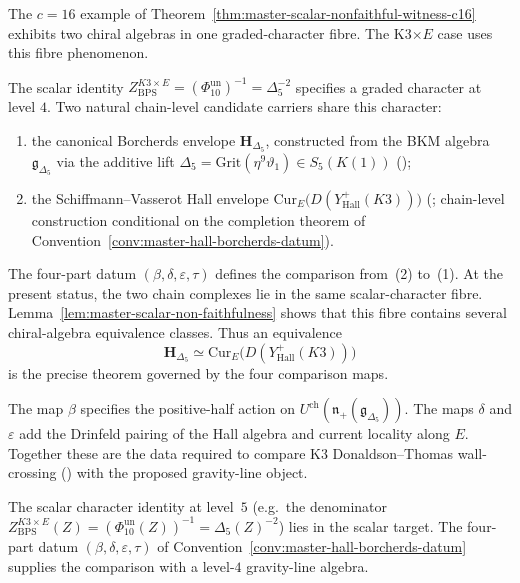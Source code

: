 \begin{remark}
\label{rem:master-witness-K3E-ramification}
The $c=16$ example of
Theorem~\ref{thm:master-scalar-nonfaithful-witness-c16} exhibits two
chiral algebras in one graded-character fibre.  The K3$\times E$ case
uses this fibre phenomenon.

The scalar identity $Z_{\mathrm{BPS}}^{K3 \times E} =
(\Phi_{10}^{\mathrm{un}})^{-1} = \Delta_5^{-2}$ specifies a graded
character at level $4$. Two natural chain-level candidate carriers
share this character:
\begin{enumerate}[label=\textup{(\arabic*)}]
\item the canonical Borcherds envelope
$\mathbf H_{\Delta_5}$, constructed from the BKM algebra
$\mathfrak g_{\Delta_5}$ via the additive lift $\Delta_5
= \mathrm{Grit}(\eta^9 \vartheta_1) \in S_5(K(1))$
\textup{(}\cite[Thm.~6.1]{Gritsenko1999}\textup{);}
\item the Schiffmann--Vasserot Hall envelope
$\mathrm{Cur}_E\bigl(D(Y^+_{\mathrm{Hall}}(K3))\bigr)$
\textup{(}\cite{SMMV23}; chain-level construction conditional on the
completion theorem of
Convention~\ref{conv:master-hall-borcherds-datum}\textup{).}
\end{enumerate}
The four-part datum $(\beta,\delta,\varepsilon,\tau)$ defines the
comparison from~\textup{(2)} to~\textup{(1)}.  At the present status,
the two chain complexes lie in the same scalar-character fibre.
Lemma~\ref{lem:master-scalar-non-faithfulness} shows that this fibre
contains several chiral-algebra equivalence classes.  Thus an
equivalence
\[
 \mathbf H_{\Delta_5}\simeq
 \mathrm{Cur}_E\bigl(D(Y^+_{\mathrm{Hall}}(K3))\bigr)
\]
is the precise theorem governed by the four comparison maps.

The map $\beta$ specifies the positive-half action on
$U^{\mathrm{ch}}(\mathfrak n_+(\mathfrak g_{\Delta_5}))$.  The maps
$\delta$ and $\varepsilon$ add the Drinfeld pairing of the Hall
algebra and current locality along $E$.  Together these are the data
required to compare K3 Donaldson--Thomas wall-crossing
\textup{(}\cite{KontsevichSoibelman}\textup{)} with the proposed
gravity-line object.
\end{remark}

\begin{remark}
\label{rem:master-scalar-shadow-promotion}
The scalar character identity at level~$5$
\textup{(}e.g.\ the denominator
$Z_{\mathrm{BPS}}^{K3\times E}(Z)
 = (\Phi_{10}^{\mathrm{un}}(Z))^{-1}
 = \Delta_5(Z)^{-2}$\textup{)} lies in the scalar target.  The
four-part datum $(\beta,\delta,\varepsilon,\tau)$ of
Convention~\ref{conv:master-hall-borcherds-datum} supplies the
comparison with a level-$4$ gravity-line algebra.
\end{remark}


